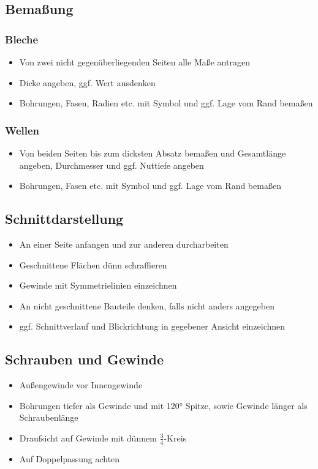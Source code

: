 \documentclass[a4paper,DIV=15,fontsize=11pt]{scrartcl}
\begin{document}
\subsection{Bemaßung}
\subsubsection{Bleche}
\begin{itemize}
	\item Von zwei nicht gegenüberliegenden Seiten alle Maße antragen
	\item Dicke angeben, ggf. Wert ausdenken
	\item Bohrungen, Fasen, Radien etc. mit Symbol und ggf. Lage vom Rand bemaßen
\end{itemize}

\subsubsection{Wellen}
\begin{itemize}
	\item Von beiden Seiten bis zum dicksten Absatz bemaßen und Gesamtlänge angeben, Durchmesser und ggf. Nuttiefe angeben
	\item Bohrungen, Fasen etc. mit Symbol und ggf. Lage vom Rand bemaßen
\end{itemize}

\subsection{Schnittdarstellung}
\begin{itemize}
	\item An einer Seite anfangen und zur anderen durcharbeiten
	\item Geschnittene Flächen dünn schraffieren
	\item Gewinde mit Symmetrielinien einzeichnen
	\item An nicht geschnittene Bauteile denken, falls nicht anders angegeben
	\item ggf. Schnittverlauf und Blickrichtung in gegebener Ansicht einzeichnen
\end{itemize}

\subsection{Schrauben und Gewinde}
\begin{itemize}
	\item Außengewinde vor Innengewinde
	\item Bohrungen tiefer als Gewinde und mit 120° Spitze, sowie Gewinde länger als Schraubenlänge
	\item Draufsicht auf Gewinde mit dünnem $\frac{3}{4}$-Kreis
	\item Auf Doppelpassung achten
\end{itemize}
\end{document}
